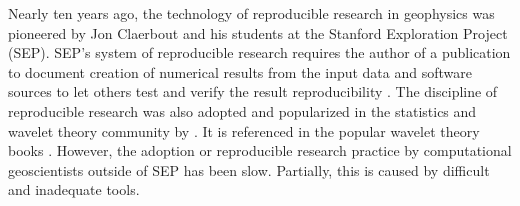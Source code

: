 Nearly ten years ago, the technology of reproducible research in
geophysics was pioneered by Jon Claerbout and his students at the
Stanford Exploration Project (SEP).  SEP's system of reproducible
research requires the author of a publication to document creation of
numerical results from the input data and software sources to let
others test and verify the result reproducibility
\cite[]{SEG-1992-0601,matt}.
The discipline of reproducible research was also adopted and
popularized in the statistics and wavelet theory community by
\cite{donoho}. It is referenced in the popular wavelet theory books
\cite[]{hubbard,mallat}.  However, the adoption or reproducible
research practice by computational geoscientists outside of SEP has
been slow.  Partially, this is caused by difficult and inadequate
tools.



